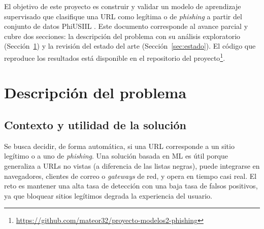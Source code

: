 \documentclass[conference]{IEEEtran}
\begin{document}
El objetivo de este proyecto es construir y validar un modelo de aprendizaje supervisado que
clasifique una URL como legítima o de \textit{phishing} a partir del conjunto de datos
PhiUSIIL \cite{prasad2024}. Este documento corresponde al avance parcial y cubre dos secciones:
la descripción del problema con su análisis exploratorio (Sección~\ref{sec:problema}) y la
revisión del estado del arte (Sección~\ref{sec:estado}). El código que reproduce los resultados
está disponible en el repositorio del proyecto\footnote{\url{https://github.com/mateor32/proyecto-modelos2-phishing}}.

\section{Descripción del problema}
\label{sec:problema}

\subsection{Contexto y utilidad de la solución}
Se busca decidir, de forma automática, si una URL corresponde a un sitio legítimo o a uno de
\textit{phishing}. Una solución basada en ML es útil porque generaliza a URLs no vistas (a
diferencia de las listas negras), puede integrarse en navegadores, clientes de correo o
\textit{gateways} de red, y opera en tiempo casi real. El reto es mantener una alta tasa de
detección con una baja tasa de falsos positivos, ya que bloquear sitios legítimos degrada la
experiencia del usuario.
\end{document}
